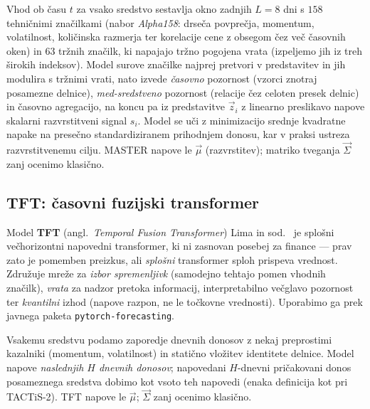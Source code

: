 Vhod ob času $t$ za vsako sredstvo sestavlja okno zadnjih $L=8$ dni s $158$ tehničnimi značilkami (nabor \emph{Alpha158}: drseča povprečja, momentum, volatilnost, količinska razmerja ter korelacije cene z obsegom čez več časovnih oken) in $63$ tržnih značilk, ki napajajo tržno pogojena vrata (izpeljemo jih iz treh širokih indeksov). Model surove značilke najprej pretvori v predstavitev in jih modulira s tržnimi vrati, nato izvede \emph{časovno} pozornost (vzorci znotraj posamezne delnice), \emph{med-sredstveno} pozornost (relacije čez celoten presek delnic) in časovno agregacijo, na koncu pa iz predstavitve $\vec{z}_i$ z linearno preslikavo napove skalarni razvrstitveni signal $s_i$. Model se uči z minimizacijo srednje kvadratne napake na presečno standardiziranem prihodnjem donosu, kar v praksi ustreza razvrstitvenemu cilju. MASTER napove le $\vec{\mu}$ (razvrstitev); matriko tveganja $\vec{\Sigma}$ zanj ocenimo klasično.

\subsection{TFT: časovni fuzijski transformer}
\label{sec:tft}
Model \textbf{TFT} (angl.\ \emph{Temporal Fusion Transformer}) Lima in sod.~\cite{lim2021tft} je splošni večhorizontni napovedni transformer, ki ni zasnovan posebej za finance --- prav zato je pomemben preizkus, ali \emph{splošni} transformer sploh prispeva vrednost. Združuje mreže za \emph{izbor spremenljivk} (samodejno tehtajo pomen vhodnih značilk), \emph{vrata} za nadzor pretoka informacij, interpretabilno večglavo pozornost ter \emph{kvantilni} izhod (napove razpon, ne le točkovne vrednosti). Uporabimo ga prek javnega paketa \texttt{pytorch-forecasting}.

Vsakemu sredstvu podamo zaporedje dnevnih donosov z nekaj preprostimi kazalniki (momentum, volatilnost) in statično vložitev identitete delnice. Model napove \emph{naslednjih $H$ dnevnih donosov}; napovedani $H$-dnevni pričakovani donos posameznega sredstva dobimo kot vsoto teh napovedi (enaka definicija kot pri TACTiS-2). TFT napove le $\vec{\mu}$; $\vec{\Sigma}$ zanj ocenimo klasično.

